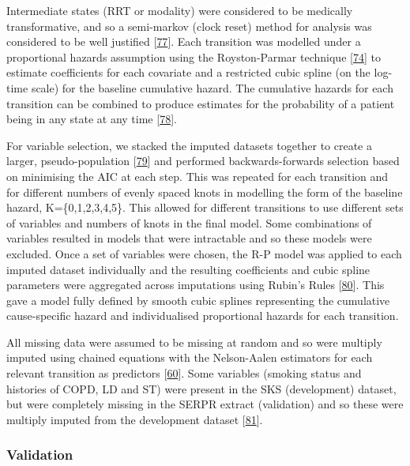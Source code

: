 \documentclass[
]{article}
\begin{document}
Intermediate states (RRT or modality) were considered to be medically transformative, and so a semi-markov (clock reset) method for analysis was considered to be well justified {[}\protect\hyperlink{ref-meira-machado_multi-state_2009}{77}{]}. Each transition was modelled under a proportional hazards assumption using the Royston-Parmar technique {[}\protect\hyperlink{ref-royston_flexible_2002}{74}{]} to estimate coefficients for each covariate and a restricted cubic spline (on the log-time scale) for the baseline cumulative hazard. The cumulative hazards for each transition can be combined to produce estimates for the probability of a patient being in any state at any time {[}\protect\hyperlink{ref-putter_tutorial_2007}{78}{]}.

For variable selection, we stacked the imputed datasets together to create a larger, pseudo-population {[}\protect\hyperlink{ref-wood_how_2008}{79}{]} and performed backwards-forwards selection based on minimising the AIC at each step. This was repeated for each transition and for different numbers of evenly spaced knots in modelling the form of the baseline hazard, K=\{0,1,2,3,4,5\}. This allowed for different transitions to use different sets of variables and numbers of knots in the final model. Some combinations of variables resulted in models that were intractable and so these models were excluded. Once a set of variables were chosen, the R-P model was applied to each imputed dataset individually and the resulting coefficients and cubic spline parameters were aggregated across imputations using Rubin's Rules {[}\protect\hyperlink{ref-rubin_multiple_1984}{80}{]}. This gave a model fully defined by smooth cubic splines representing the cumulative cause-specific hazard and individualised proportional hazards for each transition.

All missing data were assumed to be missing at random and so were multiply imputed using chained equations with the Nelson-Aalen estimators for each relevant transition as predictors {[}\protect\hyperlink{ref-white_imputing_2009}{60}{]}. Some variables (smoking status and histories of COPD, LD and ST) were present in the SKS (development) dataset, but were completely missing in the SERPR extract (validation) and so these were multiply imputed from the development dataset {[}\protect\hyperlink{ref-janssen_dealing_2009}{81}{]}.

\hypertarget{validation-2}{%
\subsubsection{Validation}\label{validation-2}}
\end{document}
